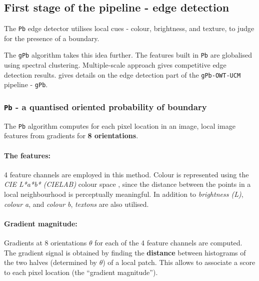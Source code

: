 \subsection{First stage of the pipeline - edge detection} %
\label{sec:ch3-gPb}
The {\tt Pb} edge detector \cite{Martin2004learning} utilises local cues - colour, brightness, and texture, to judge for the presence of a boundary. 

The {\tt gPb} algorithm \cite{Maire2008using} takes this idea further. The features built in {\tt Pb} are globalised using spectral clustering. Multiple-scale approach gives competitive edge detection results.  gives details on the edge detection part of the {\tt gPb-OWT-UCM} pipeline - {\tt gPb}.

\subsubsection{{\tt Pb} - a quantised oriented probability of boundary}
The {\tt Pb}  algorithm computes for each pixel location in an image, local image features from gradients for {\bf 8 orientations}. 

\paragraph{The features:} 4 feature channels are employed in this method. Colour is represented using the \textit{CIE L*a*b* (CIELAB)} colour space \cite{Hoffmann2003cielab}, since the distance between the points in a local neighbourhood is perceptually meaningful. %
In addition to {\it brightness (L)}, {\it colour a}, and {\it colour b}, {\it textons} are also utilised.


\paragraph{Gradient magnitude:} Gradients at 8 orientations $\theta$ for each of the 4 feature channels are computed. The gradient signal is obtained by finding the {\bf distance} %
between histograms of the two halves (determined by $\theta$) of a local patch. This allows to associate a score to each pixel location (the ``gradient magnitude'').


